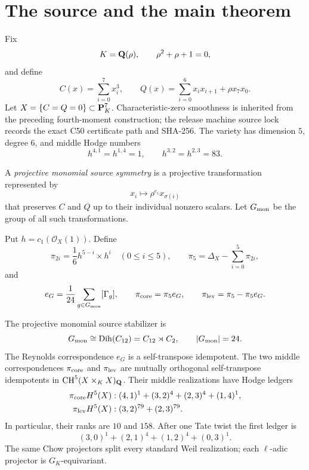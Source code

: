 \section{The source and the main theorem}

Fix
\[
 K=\mathbf Q(\rho),\qquad \rho^2+\rho+1=0,
\]
and define
\begin{equation}
\label{eq:source}
 C(x)=\sum_{i=0}^{7}x_i^3,\qquad
 Q(x)=\sum_{i=0}^{6}x_ix_{i+1}+\rho x_7x_0.
\end{equation}
Let \(X=\{C=Q=0\}\subset\mathbf P^7_K\).  Characteristic-zero smoothness is
inherited from the preceding fourth-moment construction; the release
machine source lock records the exact C50 certificate path and SHA-256.
The variety
has dimension \(5\), degree \(6\), and middle Hodge numbers
\[
 h^{4,1}=h^{1,4}=1,\qquad
 h^{3,2}=h^{2,3}=83.
\]

A \emph{projective monomial source symmetry} is a projective
transformation represented by
\[
 x_i\longmapsto \rho^{e_i}x_{\sigma(i)}
\]
that preserves \(C\) and \(Q\) up to their individual nonzero scalars.
Let \(G_{\mathrm{mon}}\) be the group of all such transformations.

Put \(h=c_1(\mathcal O_X(1))\).  Define
\begin{equation}
\label{eq:ambient-projectors}
 \pi_{2i}=\frac16h^{5-i}\times h^i\quad(0\le i\le5),
 \qquad
 \pi_5=\Delta_X-\sum_{i=0}^{5}\pi_{2i},
\end{equation}
and
\begin{equation}
\label{eq:middle-projectors}
 e_G=\frac1{24}\sum_{g\in G_{\mathrm{mon}}}[\Gamma_g],\qquad
 \pi_{\mathrm{core}}=\pi_5e_G,\qquad
 \pi_{\mathrm{lev}}=\pi_5-\pi_5e_G.
\end{equation}

\begin{theorem}
\label{thm:main}
The projective monomial source stabilizer is
\[
 G_{\mathrm{mon}}\cong\operatorname{Dih}(C_{12})=C_{12}\rtimes C_2,
 \qquad |G_{\mathrm{mon}}|=24.
\]
The Reynolds correspondence \(e_G\) is a self-transpose idempotent.
The two middle correspondences \(\pi_{\mathrm{core}}\) and \(\pi_{\mathrm{lev}}\) are
mutually orthogonal self-transpose idempotents in
\(\operatorname{CH}^5(X\times_KX)_{\mathbf Q}\).  Their middle realizations have Hodge ledgers
\[
\begin{aligned}
 \pi_{\mathrm{core}}H^5(X)&:
 (4,1)^1+(3,2)^4+(2,3)^4+(1,4)^1,\\
 \pi_{\mathrm{lev}}H^5(X)&:
 (3,2)^{79}+(2,3)^{79}.
\end{aligned}
\]
In particular, their ranks are \(10\) and \(158\).  After one Tate
twist the first ledger is
\[
 (3,0)^1+(2,1)^4+(1,2)^4+(0,3)^1.
\]
The same Chow projectors split every standard Weil realization; each
\(\ell\)-adic projector is \(G_K\)-equivariant.
\end{theorem}

